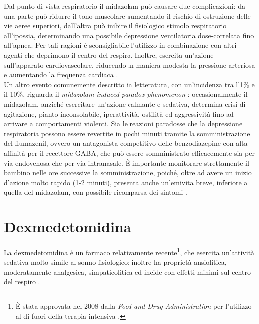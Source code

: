 Dal punto di vista respiratorio il midazolam può causare due complicazioni: da una parte può ridurre il tono muscolare aumentando il rischio di ostruzione delle vie aeree superiori, dall'altra può inibire il fisiologico stimolo respiratorio all'ipossia, determinando una possibile depressione ventilatoria dose-correlata fino all'apnea. Per tali ragioni è sconsigliabile l'utilizzo in combinazione con altri agenti che deprimono il centro del respiro. 
Inoltre, esercita un'azione sull'apparato cardiovascolare, riducendo in maniera modesta la pressione arteriosa e aumentando la frequenza cardiaca \cite{Olkkola2008}. 
\\Un altro evento comunemente descritto in letteratura, con un'incidenza tra l'1$\%$ e il 10$\%$, riguarda il \emph{midazolam-induced paradox phenomenon} \cite{Weinbroum2001}: occasionalmente il midazolam, anziché esercitare un'azione calmante e sedativa, determina crisi di agitazione, pianto inconsolabile, iperattività, ostilità ed aggressività fino ad arrivare a comportamenti violenti. Sia le reazioni paradosse che la depressione respiratoria possono essere revertite in pochi minuti tramite la somministrazione del flumazenil, ovvero un antagonista competitivo delle benzodiazepine con alta affinità per il recettore GABA, che può essere somministrato efficacemente sia per via endovenosa che per via intranasale. \`E importante monitorare strettamente il bambino nelle ore successive la somministrazione, poiché, oltre ad avere un inizio d'azione molto rapido (1-2 minuti), presenta anche un'emivita breve, inferiore a quella del midazolam, con possibile ricomparsa dei sintomi \cite{Simeupsedazione, Uptodatepharmacology}.


\section{Dexmedetomidina}

La dexmedetomidina è un farmaco relativamente recente\footnote{\`E stata approvata nel 2008 dalla \emph{Food and Drug Administration} per l'utilizzo al di fuori della terapia intensiva \cite{Simeupsedazione, Uptodatepharmacology}.}, che esercita un'attività sedativa molto simile al sonno fisiologico; inoltre ha proprietà ansiolitica, moderatamente analgesica, simpaticolitica ed incide con effetti minimi sul centro del respiro \cite{Mahmoud2015}.

